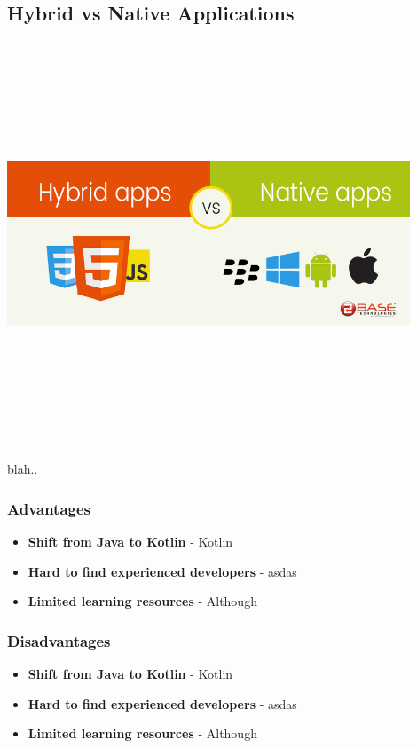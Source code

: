 \subsection{Hybrid vs Native Applications}
\par
\medskip
\begin{center}
    \includegraphics[width=12cm,height=12cm,keepaspectratio]{Images/hybridvnative.png}
\end{center}

blah..


\subsubsection{Advantages}
\begin{itemize}
    \item \textbf{Shift from Java to Kotlin} - Kotlin
    \item \textbf{Hard to find experienced developers} - asdas
    \item \textbf{Limited learning resources} - Although
\end{itemize}
\subsubsection{Disadvantages}
\begin{itemize}
    \item \textbf{Shift from Java to Kotlin} - Kotlin
    \item \textbf{Hard to find experienced developers} - asdas
    \item \textbf{Limited learning resources} - Although
\end{itemize}

